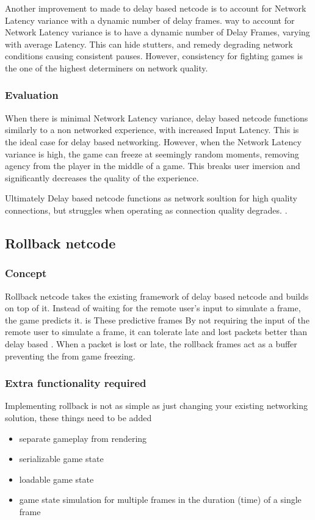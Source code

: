 \documentclass{entcs}
\begin{document}
Another improvement to made to delay based netcode is to account for Network Latency variance with a dynamic number of delay frames. way to account for Network Latency variance is to have a dynamic number of Delay Frames, varying with average Latency\cite{DelayVsRollback}. This can hide stutters, and remedy degrading network conditions causing consistent pauses. However, consistency for fighting games is the one of the highest determiners on network quality\cite{Core-ARollback}.

\subsubsection{Evaluation}
When there is minimal Network Latency variance, delay based netcode functions similarly to a non networked experience, with increased Input Latency. This is the ideal case for delay based networking. However, when the Network Latency variance is high, the game can freeze at seemingly random moments, removing agency from the player in the middle of a game. This breaks user imersion and significantly decreases the quality of the experience\cite{DelayVsRollback}.

Ultimately Delay based netcode functions as network soultion for high quality connections, but struggles when operating as connection quality degrades. \cite{KIInterview}.
\subsection{Rollback netcode}
\subsubsection{Concept}
Rollback netcode takes the existing framework of delay based netcode and builds on top of it. Instead of waiting for the remote user's input to simulate a frame, the game predicts it.  is These predictive frames By not requiring the input of the remote user to simulate a frame, it can tolerate late and lost packets better than delay based \cite{GGPODocumentation}. When a packet is lost or late, the rollback frames act as a buffer preventing the from game freezing.

\subsubsection{Extra functionality required}
Implementing rollback is not as simple as just changing your existing networking solution, these things need to be added
\begin{itemize}
\item separate gameplay from rendering
\item serializable game state
\item loadable game state
\item game state simulation for multiple frames in the duration (time) of a single frame
\end{itemize}
\end{document}
